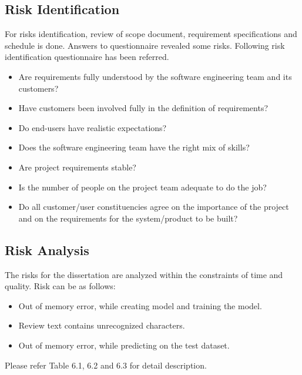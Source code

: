 \documentclass[oneside,a4paper,12pt]{pictreport}
\begin{document}
\subsection{Risk Identification}
For risks identification, review of scope document, requirement 
specifications and schedule is done. Answers to questionnaire revealed 
some risks. Following risk identification questionnaire has been referred.
\begin{itemize}
\item Are requirements fully understood by the software engineering team and its customers?
\item Have customers been involved fully in the definition of requirements?
\item Do end-users have realistic expectations?
\item Does the software engineering team have the right mix of skills?
\item Are project requirements stable?
\item Is the number of people on the project team adequate to do the job?
\item Do all customer/user constituencies agree on the importance of the project 
and on the requirements for the system/product to be built?
\end{itemize}

\subsection{Risk Analysis}
The risks for the dissertation are analyzed within the constraints of time and quality. Risk can be as follows:

\begin{itemize}
\item Out of memory error, while creating model and training the model.
\item Review text contains unrecognized characters.
\item Out of memory error, while predicting on the test dataset.
\end{itemize}
Please refer Table 6.1, 6.2 and 6.3 for detail description.
\end{document}
